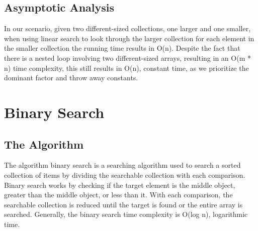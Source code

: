 \documentclass[letterpaper, 10pt,DIV=13]{scrartcl}
\numberwithin{equation}{section} %
\numberwithin{figure}{section} %
\numberwithin{table}{section} %
\begin{document}
\pagebreak

\subsection{Asymptotic Analysis}
In our scenario, given two different-sized collections, one larger and one smaller, when using linear search to look through the larger collection for each element in the smaller collection the running time results in O(n). Despite the fact that there is a nested loop involving two different-sized arrays, resulting in an O(m * n) time complexity, this still results in O(n), constant time, as we prioritize the dominant factor and throw away constants.





\section{Binary Search}

\subsection{The Algorithm}
The algorithm binary search is a searching algorithm used to search a sorted collection of items by dividing the searchable collection with each comparison. Binary search works by checking if the target element is the middle object, greater than the middle object, or less than it. With each comparison, the searchable collection is reduced until the target is found or the entire array is searched. Generally, the binary search time complexity is O(log n), logarithmic time. 

\pagebreak
\end{document}
